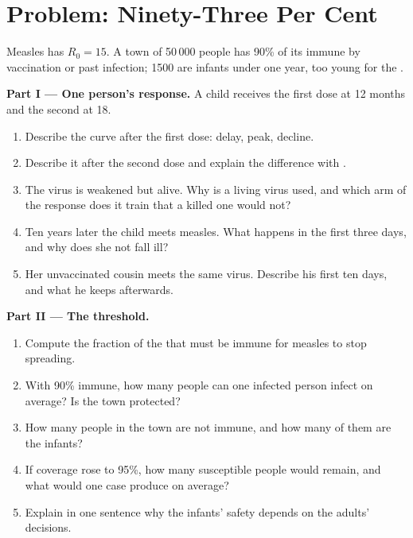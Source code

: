 \section{Problem: Ninety-Three Per Cent}

\begin{problem}
\label{pb:g12:adaptive-immunity:1}
Measles has $R_0 = 15$. A town of 50\,000 people has 90\% of its
 immune by vaccination or past infection; 1500 are infants
under one year, too young for the .

\medskip
\noindent\textbf{Part I --- One person's response.}
A child receives the first dose at 12 months and the second at 18.
\begin{enumerate}
  \item Describe the  curve after the first dose: delay, peak,
        decline.
  \item Describe it after the second dose and explain the difference
        with .
  \item The  virus is weakened but alive. Why is a living virus
        used, and which arm of the response does it train that a
        killed one would not?
  \item Ten years later the child meets measles. What happens in the
        first three days, and why does she not fall ill?
  \item Her unvaccinated cousin meets the same virus. Describe his
        first ten days, and what he keeps afterwards.
\end{enumerate}

\medskip
\noindent\textbf{Part II --- The threshold.}
\begin{enumerate}[resume]
  \item Compute the fraction of the  that must be immune for
        measles to stop spreading.
  \item With 90\% immune, how many people can one infected person
        infect on average? Is the town protected?
  \item How many people in the town are not immune, and how many of
        them are the infants?
  \item If coverage rose to 95\%, how many susceptible people would
        remain, and what would one case produce on average?
  \item Explain in one sentence why the infants' safety depends on the
        adults' decisions.
\end{enumerate}


\end{problem}
